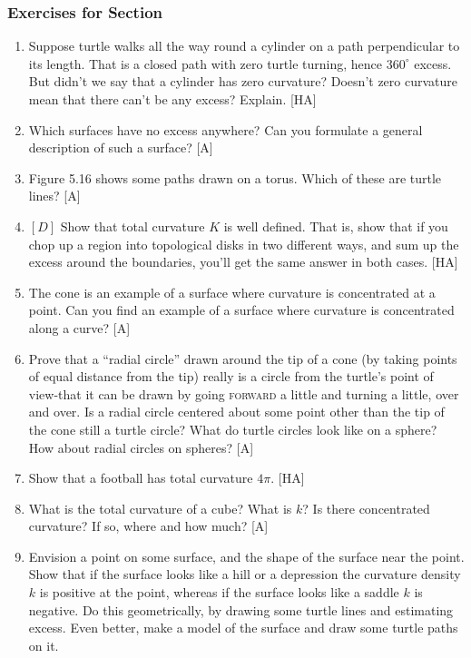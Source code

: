 \documentclass{book}
\begin{document}
\subsubsection{Exercises for Section \thesection}
\begin{enumerate}
\item Suppose turtle walks all the way round a cylinder on a path perpendicular to its length. That is a closed path with zero turtle turning,
hence $360^{\circ}$ excess. But didn't we say that a cylinder has zero curvature?
Doesn't zero curvature mean that there can't be any excess? Explain.
[HA]

\item Which surfaces have no excess anywhere? Can you formulate a
general description of such a surface? [A]

\item Figure 5.16 shows some paths drawn on a torus. Which of these are
turtle lines? [A]

\item $[D]$ Show that total curvature $K$ is well defined. That is, show that
if you chop up a region into topological disks in two different ways, and
sum up the excess around the boundaries, you'll get the same answer in
both cases. [HA]

\item The cone is an example of a surface where curvature is concentrated
at a point. Can you find an example of a surface where curvature is
concentrated along a curve? [A]

\item Prove that a ``radial circle'' drawn around the tip of a cone (by taking
points of equal distance from the tip) really is a circle from the turtle's
point of view-that it can be drawn by going \textsc{forward} a little and turning
a little, over and over. Is a radial circle centered about some point
other than the tip of the cone still a turtle circle? What do turtle circles
look like on a sphere? How about radial circles on spheres? [A]

\item Show that a football has total curvature $4 \pi$. [HA]

\item What is the total curvature of a cube? What is $k$? Is there concentrated curvature? If so, where and how much? [A]

\item Envision a point on some surface, and the shape of the surface near
the point. Show that if the surface looks like a hill or a depression the
curvature density $k$ is positive at the point, whereas if the surface looks
like a saddle $k$ is negative. Do this geometrically, by drawing some turtle
lines and estimating excess. Even better, make a model of the surface
and draw some turtle paths on it.


\end{enumerate}
\end{document}

